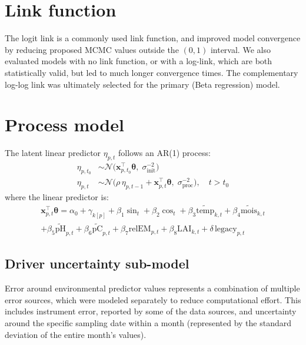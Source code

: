 \documentclass[11pt]{article}
\begin{document}
\section{Link function}

The logit link is a commonly used link function, and improved model convergence by reducing proposed MCMC values outside the $(0,1)$ interval. We also evaluated models with no link function, or with a log-link, which are both statistically valid, but led to much longer convergence times. The complementary log-log link was ultimately selected for the primary (Beta regression) model.


\section{Process model}

The latent linear predictor $\eta_{p,t}$ follows an AR(1) process:
\begin{align}
\eta_{p, t_0} &\sim \mathcal{N}\!\bigl(\mathbf{x}_{p,t_0}^{\top}\boldsymbol{\theta},\; \sigma_{\mathrm{init}}^{-2}\bigr) \\[4pt]
\eta_{p,t} &\sim \mathcal{N}\!\bigl(\rho\,\eta_{p,t-1} + \mathbf{x}_{p,t}^{\top}\boldsymbol{\theta},\; \sigma_{\mathrm{proc}}^{-2}\bigr), \quad t > t_0
\end{align}
where the linear predictor is:
\begin{multline}
\mathbf{x}_{p,t}^{\top}\boldsymbol{\theta} = \alpha_0 + \gamma_{k[p]} + \beta_1 \sin_t + \beta_2 \cos_t + \beta_3 \widetilde{\mathrm{temp}}_{k,t} + \beta_4 \widetilde{\mathrm{mois}}_{k,t} \\
+ \beta_5 \widetilde{\mathrm{pH}}_{p,t} + \beta_6 \widetilde{\mathrm{pC}}_{p,t} + \beta_7 \mathrm{relEM}_{p,t} + \beta_8 \mathrm{LAI}_{k,t} + \delta\,\mathrm{legacy}_{p,t}
\end{multline}

\subsection*{Driver uncertainty sub-model}

Error around environmental predictor values represents a combination of multiple error sources, which were modeled separately to reduce computational effort. This includes instrument error, reported by some of the data sources, and uncertainty around the specific sampling date within a month (represented by the standard deviation of the entire month's values).
\end{document}
